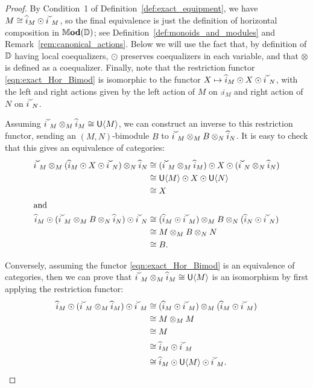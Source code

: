 \documentclass[11pt,oneside,article]{memoir}
\begin{document}
\begin{proof}
  By Condition~1 of Definition~\ref{def:exact_equipment}, we have $M\iso\comp{i}_M\odot\conj{i}_M$, so the final equivalence is just the definition of horizontal composition in $\mathbb{M}\mathbf{od}(\mathbb{D})$; see Definition~\ref{def:monoids_and_modules} and Remark~\ref{rem:canonical_actions}. Below we will use the fact that, by definition of $\mathbb{D}$ having local coequalizers, $\odot$ preserves coequalizers in each variable, and that $\otimes$ is defined as a coequalizer. Finally, note that the restriction functor \eqref{eqn:exact_Hor_Bimod} is isomorphic to the functor
  $X\mapsto\comp{i}_M\odot X\odot\conj{i}_N$, with the left and right actions given by the left
  action of $M$ on $\comp{i}_M$ and right action of $N$ on $\conj{i}_N$. 
  
  Assuming
  $\conj{i}_M\otimes_M\comp{i}_M\iso\unit{\Col{M}}$, we can construct an inverse to this restriction
  functor, sending an $(M,N)$-bimodule $B$ to $\conj{i}_M\otimes_M B\otimes_N\comp{i}_N$. It is easy
  to check that this gives an equivalence of categories:
  \begin{align*}
    \conj{i}_M\otimes_M (\comp{i}_M\odot X\odot\conj{i}_N)\otimes_N\comp{i}_N
      &\iso (\conj{i}_M\otimes_M\comp{i}_M)\odot X\odot (\conj{i}_N\otimes_N\comp{i}_N) \\
      &\iso \unit{\Col{M}}\odot X\odot \unit{\Col{N}} \\
      &\iso X \\
    \intertext{and}
    \comp{i}_M\odot (\conj{i}_M\otimes_M B\otimes_N\comp{i}_N)\odot \conj{i}_N
      &\iso (\comp{i}_M\odot\conj{i}_M)\otimes_M B\otimes_N (\comp{i}_N\odot\conj{i}_N) \\
      &\iso M\otimes_M B\otimes_N N \\
      &\iso B.
  \end{align*}

  Conversely, assuming the functor \eqref{eqn:exact_Hor_Bimod} is an equivalence of categories, then we can prove
  that $\conj{i}_M\otimes_M\comp{i}_M\iso\unit{\Col{M}}$ is an isomorphism by first applying the restriction functor:
  \begin{align*}
    \comp{i}_M\odot(\conj{i}_M\otimes_M\comp{i}_M)\odot\conj{i}_M
      &\iso (\comp{i}_M\odot\conj{i}_M)\otimes_M(\comp{i}_M\odot\conj{i}_M) \\
      &\iso M\otimes_M M \\
      &\iso M \\
      &\iso \comp{i}_M\odot\conj{i}_M \\
      &\iso \comp{i}_M\odot\unit{\Col{M}}\odot\conj{i}_M. \qedhere
  \end{align*} 
\end{proof}
\end{document}
